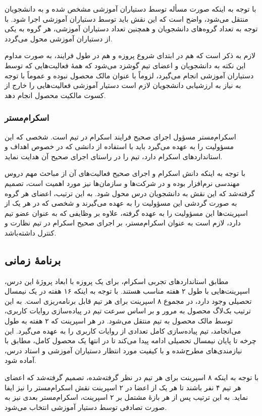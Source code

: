\documentclass[a4paper,notitlepage]{report}
\begin{document}
با توجه به اینکه صورت مسأله توسط دستیاران آموزشی مشخص شده و به دانشجویان منتقل می‌شود،
واضح است که این نقش باید توسط دستیاران آموزشی اجرا شود.
با توجه به تعداد گروه‌های دانشجویان و همچنین تعداد دستیاران آموزشی، هر گروه به یکی از دستیاران آموزشی محول می‌گردد.

لازم به ذکر است که هم در ابتدای شروع پروزه و هم در طول فرایند، به صورت مداوم این نکته به دانشجویان و اعضای تیم گوشزد می‌شود
که همهٔ فعالیت‌هایی که توسط دستیاران آموزشی انجام می‌گیرد، لزوماً با عنوان مالک محصول نبوده و عموماً با توجه به نیاز به ارزشیابی دانشجویان لازم است
دستیار آموزشی فعالیت‌هایی را خارج از کسوت مالکیت محصول انجام دهد.
\subsubsection{اسکرام‌مستر}
اسکرام‌مستر مسؤول اجرای صحیح فرایند اسکرام در تیم است.
شخصی که این مسؤولیت را به عهده می‌گیرد باید با استفاده از دانشی که در خصوص اهداف و استانداردهای اسکرام دارد، تیم را در راستای اجرای صحیح آن هدایت نماید.

با توجه به اینکه دانش اسکرام و اجرای صحیح فعالیت‌های آن از مباحث مهم دروس مهندسی نرم‌افزار بوده و در شرکت‌ها و سازمان‌ها نیز مورد اهمیت است،
تصمیم گرفته‌شد که این نقش به دانشجویان درس محول شود.
به این ترتیب، اعضای هر گروه به صورت گردشی این مسؤولیت را به عهده می‌گیرند و شخصی که در هر یک از اسپرینت‌ها این مسؤولیت را به عهده گرفته،
علاوه بر وظایفی که به عنوان عضو تیم دارد، لازم است به عنوان اسکرام‌مستر، بر اجرای صحیح اسکرام در تیم نظارت و کنترل داشته‌باشد.
\subsection{برنامهٔ زمانی}
مطابق استانداردهای تجربی اسکرام، برای یک پروزه با ابعاد پروژهٔ این درس، اسپرینت‌هایی با طول ۲ هفته مناسب هستند.
با توجه به اینکه ۱۶ هفته در یک نیمسال تحصیلی وجود دارد، در مجموع ۸ اسپرینت برای هر تیم قابل برنامه‌ریزی است.
به این ترتیب بک‌لاگ محصول به مرور و بر اساس سرعت تیم در پیاده‌سازی روایات کاربری، توسط مالک محصول به تیم منتقل می‌شود.
در هر اسپرینت که ۲ هفته به طول می‌انجامد، تیم پیاده‌سازی کامل تعدادی از روایات کاربری را به عهده می‌گیرد.
این چرخه تا پایان نیمسال تحصیلی ادامه پیدا می‌کند تا در انتها یک محصول کامل، مطابق با نیازمندی‌های مطرح‌شده و با کیفیت مورد انتظار دستیاران آموزشی و استاد درس، آماده شود.

با توجه به اینکه ۸ اسپرینت برای هر تیم در نظر گرفته‌شده، تصمیم گرفته‌شد که اعضای هر تیم ۴ نفر باشند تا هر یک از اعضا در ۲ اسپرینت نقش اسکرام‌مستر را نیز ایفا نماید.
به این ترتیب پس از هر بازهٔ مشتمل بر ۲ اسپرینت، اسکرام‌مستر بعدی نیز به صورت تصادفی توسط دستیار آموزشی انتخاب می‌شود.
\end{document}
